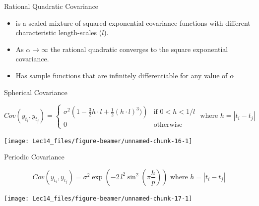 \documentclass[11pt,ignorenonframetext,]{beamer}
\providecommand{\tightlist}{%
  \setlength{\itemsep}{0pt}\setlength{\parskip}{0pt}}
\begin{document}
\begin{frame}[t]{Rational Quadratic Covariance}
\protect\hypertarget{rational-quadratic-covariance-1}{}

\begin{itemize}
\tightlist
\item
  is a scaled mixture of squared exponential covariance functions with
  different characteristic length-scales (\(l\)).
\end{itemize}

\vspace{1mm}

\begin{itemize}
\tightlist
\item
  As \(\alpha \to \infty\) the rational quadratic converges to the
  square exponential covariance.
\end{itemize}

\vspace{1mm}

\begin{itemize}
\tightlist
\item
  Has sample functions that are infinitely differentiable for any value
  of \(\alpha\)
\end{itemize}

\end{frame}

\begin{frame}[t]{Spherical Covariance}
\protect\hypertarget{spherical-covariance}{}

\vspace{-10mm}
\footnotesize

\[ Cov(y_{t_i}, y_{t_j}) = \begin{cases}
\sigma^2\left(1 - \frac{3}{2} h \cdot l + \frac{1}{2} (h \cdot l)^3)\right) & \text{if   } 0 < h < 1/l \\
0 & \text{otherwise}
\end{cases} \text{   where } h = |t_i - t_j|\]

\begin{center}\texttt{[image: Lec14\_files/figure-beamer/unnamed-chunk-16-1]} \end{center}

\end{frame}

\begin{frame}[t]{Periodic Covariance}
\protect\hypertarget{periodic-covariance}{}

\vspace{-10mm}

\[ Cov(y_{t_i}, y_{t_j}) = \sigma^2 \exp\left(-2\, l^2 \sin^2\left(\pi\frac{h}{p}\right)\right)  \text{   where } h = |t_i - t_j| \]

\begin{center}\texttt{[image: Lec14\_files/figure-beamer/unnamed-chunk-17-1]} \end{center}

\end{frame}
\end{document}
